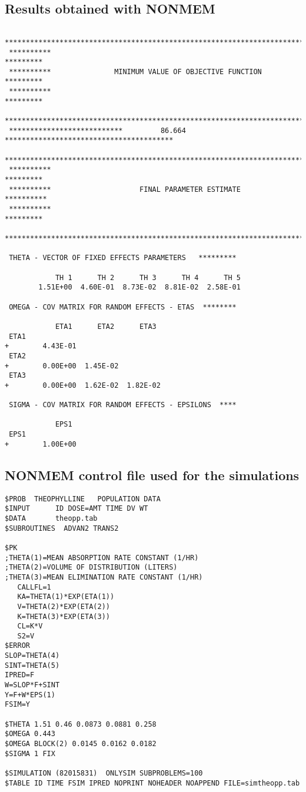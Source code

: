 \subsection*{Results obtained with NONMEM}\label{sec:appresnonmem}
{\small
\begin{verbatim}
 ***************************************************************************************
 **********                                                                    ********* 
 **********               MINIMUM VALUE OF OBJECTIVE FUNCTION                  ********* 
 **********                                                                    ********* 
 ***************************************************************************************
 ***************************         86.664     **************************************** 
 ***************************************************************************************
 **********                                                                    ********* 
 **********                     FINAL PARAMETER ESTIMATE                      **********
 **********                                                                    ********* 
 ***************************************************************************************

 THETA - VECTOR OF FIXED EFFECTS PARAMETERS   *********

            TH 1      TH 2      TH 3      TH 4      TH 5
        1.51E+00  4.60E-01  8.73E-02  8.81E-02  2.58E-01

 OMEGA - COV MATRIX FOR RANDOM EFFECTS - ETAS  ********

            ETA1      ETA2      ETA3
 ETA1
+        4.43E-01
 ETA2
+        0.00E+00  1.45E-02
 ETA3
+        0.00E+00  1.62E-02  1.82E-02
 
 SIGMA - COV MATRIX FOR RANDOM EFFECTS - EPSILONS  ****

            EPS1 
 EPS1
+        1.00E+00
\end{verbatim}
}

\newpage
{}
\subsection*{NONMEM control file used for the simulations}\label{sec:appsimulctr}
{\small
\begin{verbatim}
$PROB  THEOPHYLLINE   POPULATION DATA
$INPUT      ID DOSE=AMT TIME DV WT
$DATA       theopp.tab
$SUBROUTINES  ADVAN2 TRANS2 

$PK
;THETA(1)=MEAN ABSORPTION RATE CONSTANT (1/HR)
;THETA(2)=VOLUME OF DISTRIBUTION (LITERS)
;THETA(3)=MEAN ELIMINATION RATE CONSTANT (1/HR)
   CALLFL=1
   KA=THETA(1)*EXP(ETA(1))
   V=THETA(2)*EXP(ETA(2))
   K=THETA(3)*EXP(ETA(3))
   CL=K*V
   S2=V
$ERROR
SLOP=THETA(4)
SINT=THETA(5)
IPRED=F
W=SLOP*F+SINT
Y=F+W*EPS(1)
FSIM=Y

$THETA 1.51 0.46 0.0873 0.0881 0.258
$OMEGA 0.443
$OMEGA BLOCK(2) 0.0145 0.0162 0.0182
$SIGMA 1 FIX

$SIMULATION (82015831)  ONLYSIM SUBPROBLEMS=100
$TABLE ID TIME FSIM IPRED NOPRINT NOHEADER NOAPPEND FILE=simtheopp.tab
\end{verbatim}
}

